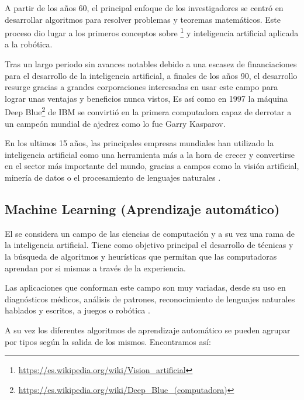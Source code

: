 A partir de los años 60, el principal enfoque de los investigadores se centró en desarrollar algoritmos para resolver problemas y teoremas matemáticos. Este proceso dio lugar a los primeros conceptos sobre \footnote{\url{https://es.wikipedia.org/wiki/Vision\_artificial}} y inteligencia artificial aplicada a la robótica.

Tras un largo periodo sin avances notables debido a una escasez de financiaciones para el desarrollo de la inteligencia artificial, a finales de los años 90, el desarrollo resurge gracias a grandes corporaciones interesadas en usar este campo para lograr unas ventajas y beneficios nunca vistos, Es así como en 1997 la máquina Deep Blue\footnote{\url{https://es.wikipedia.org/wiki/Deep_Blue_(computadora)}} de IBM se convirtió en la primera computadora capaz de derrotar a un campeón mundial de ajedrez como lo fue Garry Kasparov.

En los ultimos 15 años, las principales empresas mundiales han utilizado la inteligencia artificial como una herramienta más a la hora de crecer y convertirse en el sector más importante del mundo, gracias a campos como la visión artificial, minería de datos o el procesamiento de lenguajes naturales \cite{aihistory}.

\subsection{Machine Learning (Aprendizaje automático)}
El  se considera un campo de las ciencias de computación y a su vez una rama de la inteligencia artificial. Tiene como objetivo principal el desarrollo de técnicas y la búsqueda de algoritmos y heurísticas que permitan que las computadoras aprendan por si mismas a través de la experiencia.

Las aplicaciones que conforman este campo son muy variadas, desde su uso en diagnósticos médicos, análisis de patrones, reconocimiento de lenguajes naturales hablados y escritos, a juegos o robótica \cite{wiki:apredizaje_automatico}.

A su vez los diferentes algoritmos de aprendizaje automático se pueden agrupar por tipos según la salida de los mismos.
Encontramos así:


